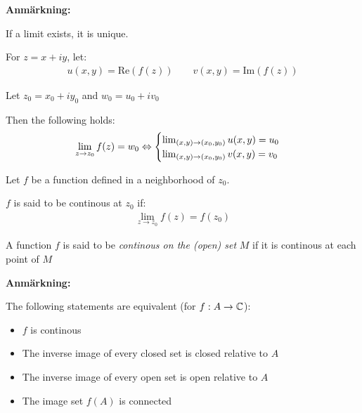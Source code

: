 \par\bigskip
\noindent\textbf{Anmärkning:}\par
\noindent If a limit exists, it is unique.
\par\bigskip
\begin{theo}[]{}
  For $z = x+iy$, let:
  \begin{equation*}
    \begin{gathered}
      u(x,y) = \text{Re}(f(z))\qquad v(x,y) = \text{Im}(f(z))
    \end{gathered}
  \end{equation*}
  \par\bigskip
  \noindent Let $z_0 = x_0+iy_0$ and $w_0 = u_0+iv_0$\par
  \noindent Then the following holds:
  \begin{equation*}
    \begin{gathered}
      \lim_{z\to z_0} f(z) = w_0\Leftrightarrow\begin{cases}\lim_{(x,y)\to(x_0,y_0)}u(x,y) = u_0\\\lim_{(x,y)\to(x_0,y_0)}v(x,y) = v_0\end{cases}
    \end{gathered}
  \end{equation*}
\end{theo}
\par\bigskip
\begin{theo}{}
  Let $f$ be a function defined in a neighborhood of $z_0$.
  \par\bigskip
  \noindent $f$ is said to be continous at $z_0$ if:
  \begin{equation*}
    \begin{gathered}
      \lim_{z\to z_0} f(z) = f(z_0)
    \end{gathered}
  \end{equation*}
  \par\bigskip
  \noindent A function $f$ is said to be \textit{continous on the (open) set} $M$ if it is continous at each point of $M$ 
\end{theo}
\newpage
\noindent\textbf{Anmärkning:}\par
\noindent The following statements are equivalent (for $f:A\to\mathbb{C}$):\par 
\begin{itemize}
  \item $f$ is continous
  \item The inverse image of every closed set is closed relative to $A$
  \item The inverse image of every open set is open relative to $A$
  \item The image set $f(A)$ is connected
\end{itemize}
